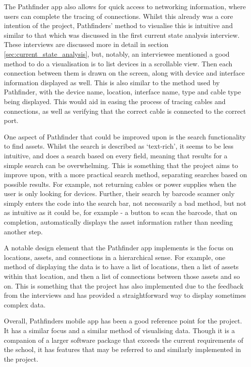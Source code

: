 \documentclass [11pt,a4paper]{article}
\begin{document}
The Pathfinder app also allows for quick access to networking information, where users can complete the tracing of connections. Whilst this already was a core intention of the project, Pathfinders' method to visualise this is intuitive and similar to that which was discussed in the first current state analysis interview. These interviews are discussed more in detail in section \ref{sec:current_state_analysis}, but, notably, an interviewee mentioned a good method to do a visualisation is to list devices in a scrollable view. Then each connection between them is drawn on the screen, along with device and interface information displayed as well. This is also similar to the method used by Pathfinder, with the device name, location, interface name, type and cable type being displayed. This would aid in easing the process of tracing cables and connections, as well as verifying that the correct cable is connected to the correct port.

One aspect of Pathfinder that could be improved upon is the search functionality to find assets. Whilst the search is described as `text-rich', it seems to be less intuitive, and does a search based on every field, meaning that results for a simple search can be overwhelming. This is something that the project aims to improve upon, with a more practical search method, separating searches based on possible results. For example, not returning cables or power supplies when the user is only looking for devices. Further, their search by barcode scanner only simply enters the code into the search bar, not necessarily a bad method, but not as intuitive as it could be, for example - a button to scan the barcode, that on completion, automatically displays the asset information rather than needing another step.

A notable design element that the Pathfinder app implements is the focus on locations, assets, and connections in a hierarchical sense. For example, one method of displaying the data is to have a list of locations, then a list of assets within that location, and then a list of connections between those assets and so on. This is something that the project has also implemented due to the feedback from the interviews and has provided a straightforward way to display sometimes complex data.

Overall, Pathfinders mobile app has been a good reference point for the project. It has a similar focus and a similar method of visualising data. Though it is a companion of a larger software package that exceeds the current requirements of the school, it has features that may be referred to and similarly implemented in the project.  
\end{document}
